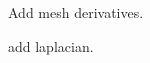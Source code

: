 
\begin{DoxyRefList}
\item[\label{todo__todo000001}%
\hypertarget{todo__todo000001}{}%
Module \hyperlink{namespacemirana}{mirana} ]Add mesh derivatives. 

add laplacian. 
\end{DoxyRefList}